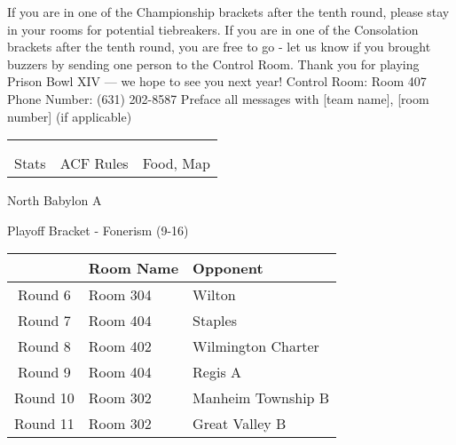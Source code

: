 \documentclass{article}%
\begin{document}
\vspace*{30pt}%
\linebreak%
If you are in one of the Championship brackets after the tenth round, please stay in your rooms for potential tiebreakers.\newline%
\newline%
If you are in one of the Consolation brackets after the tenth round, you are free to go {-} let us know if you brought buzzers by sending one person to the Control Room.\newline%
\newline%
Thank you for playing Prison Bowl XIV — we hope to see you next year!\newline%
\newline%
Control Room: Room 407\newline%
Phone Number: (631) 202{-}8587\newline%
Preface all messages with {[}team name{]}, {[}room number{]} (if applicable)%
\vspace*{30pt}%
\newline%
%
\begin{tabularx}{\textwidth}{YYY}%
  &  &  \\%
\\%
Stats&ACF Rules&Food, Map\\%
\end{tabularx}%
\newpage%
\begin{center}%
\begin{Huge}%
North Babylon A%
\end{Huge}%
\vspace*{12pt}%
\linebreak%
\begin{Large}%
Playoff Bracket {-} Fonerism (9{-}16)%
\end{Large}%
\end{center}%
\vspace*{4pt}%
%
\begin{tabularx}{\textwidth}{|c|Y|Y|}%
\hline%
&Room Name&Opponent\\%
\hline%
Round 6&Room 304&Wilton\\%
Round 7&Room 404&Staples\\%
Round 8&Room 402&Wilmington Charter\\%
Round 9&Room 404&Regis A\\%
Round 10&Room 302&Manheim Township B\\%
Round 11&Room 302&Great Valley B\\%
\hline%
\end{tabularx}%
\end{document}
